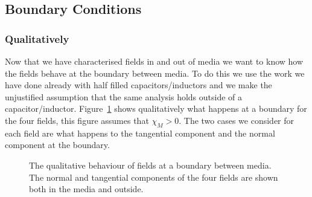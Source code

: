    \subsection{Boundary Conditions}
    \subsubsection{Qualitatively}
    Now that we have characterised fields in and out of media we want to know how the fields behave at the boundary between media.
    To do this we use the work we have done already with half filled capacitors/inductors and we make the unjustified assumption that the same analysis holds outside of a capacitor/inductor.
    Figure~\ref{fig:fields at boundaries} shows qualitatively what happens at a boundary for the four fields, this figure assumes that \(\chi_M > 0\).
    The two cases we consider for each field are what happens to the tangential component and the normal component at the boundary.
    \begin{figure}[ht]
        \centering
        \caption{The qualitative behaviour of fields at a boundary between media. The normal and tangential components of the four fields are shown both in the media and outside.}
        \label{fig:fields at boundaries}
    \end{figure}

